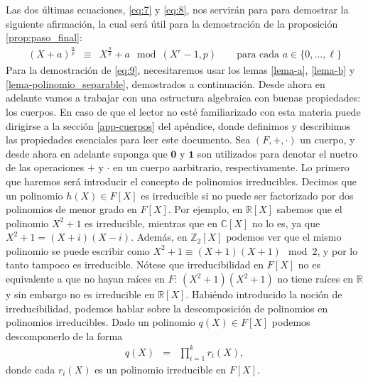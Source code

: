 \documentclass[10pt]{article}
\newcommand{\0}{\mathbf{0}}
\newcommand{\1}{\mathbf{1}}
\newcommand{\modulop}{\mod (X^r-1,p)}
\newcommand{\modl}{\mod}
\newcommand{\+}{\oplus}
\newcommand{\comentario}[1]{}
\newcommand{\comentarioin}[1]{}
\theoremstyle{remark}
\theoremstyle{remark}
\begin{document}
		Las dos últimas ecuaciones, \eqref{eq:7} y \eqref{eq:8}, nos servirán para para demostrar la siguiente afirmación, la cual será útil para la demostración de la proposición \ref{prop:paso_final}:
	\begin{eqnarray}
		(X+a)^{\frac{n}{p}}&\equiv &X^{\frac{n}{p}}+a\modulop \quad\quad \text{para cada } a \in \{0, \ldots, \ell\}  \label{eq:9}
	\end{eqnarray}
	Para la demostración de \eqref{eq:9}, necesitaremos usar los lemas \ref{lema-a}, \ref{lema-b} y \ref{lema-polinomio_separable}, demostrados a continuación. %
Desde ahora en adelante vamos a trabajar con una estructura algebraica con buenas propiedades: los cuerpos. En caso de que el lector no esté familiarizado con esta materia puede dirigirse a la sección \ref{app-cuerpos} del apéndice, donde definimos y describimos las propiedades esenciales para leer este documento. Sea $(F,+,\cdot)$ un cuerpo, y desde ahora en adelante suponga que $\0$ y $\1$ son utilizados para denotar el nuetro de las operaciones $+$ y $\cdot$ en un cuerpo aarbitrario, respectivamente. Lo primero que haremos será introducir el concepto de polinomios irreducibles. Decimos que un polinomio $h(X)\in F[X]$ es irreducible si no puede ser factorizado por dos polinomios de menor grado en $F[X]$. Por ejemplo, en $\mathbb{R}[X]$ sabemos que el polinomio $X^2+1$ es irreducible, mientras que en $\mathbb{C}[X]$ no lo es, ya que $X^2+1 = (X+i)(X-i)$. Además, en $\mathbb{Z}_2[X]$ podemos ver que el mismo polinomio se puede escribir como \mbox{$X^2+1 \equiv (X+1)(X+1) \modl 2$}, y por lo tanto tampoco es irreducible. Nótese que irreducibilidad en $F[X]$ no es equivalente a que no hayan raíces en $F$: $(X^2+1)(X^2+1)$ no tiene raíces en $\mathbb{R}$ y sin embargo no es irreducible en $\mathbb{R}[X]$. Habiéndo introducido la noción de irreducibilidad, podemos hablar sobre la descomposición de polinomios en polinomios irreducibles. Dado un polinomio $q(X)\in F[X]$ podemos descomponerlo de la forma 
\begin{eqnarray}
	q(X) & = & \prod\limits_{i=1}^kr_i(X), \label{descomp pol}
\end{eqnarray}
donde cada $r_i(X)$ es un polinomio irreducible en $F[X]$.
\end{document}
